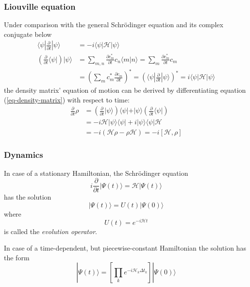 \documentclass[11.5pt,a4paper]{article}
\begin{document}
\subsubsection{Liouville equation}
Under comparison with the general Schr\"odinger equation and its complex conjugate below
\begin{align}
 \langle \psi | \frac{\partial}{\partial t} |\psi\rangle  & = -i \langle \psi | \mathcal{H} |\psi\rangle \\
  \left( \frac{\partial}{\partial t} \langle \psi | \right)  |\psi\rangle
   & = \sum_{m,n} \frac{\partial c_m^*}{\partial t} c_n \langle m | n \rangle 
   =  \sum_{m} \frac{\partial c_m^*}{\partial t} c_m \\
   & = \left( \sum_{m} c_m^* \frac{\partial c_m}{\partial t}\right)^*
   = \left( \langle \psi | \frac{\partial}{\partial t} |\psi\rangle \right)^* = i \langle \psi |\mathcal{H} |\psi\rangle
\end{align}
the density matrix' equation of motion can be derived by differentiating equation (\ref{eq-density-matrix}) with respect to time:
\begin{align}
 \frac{\partial}{\partial t} \rho & = \left( \frac{\partial}{\partial t} | \psi \rangle \right) \langle \psi | + | \psi \rangle \left( \frac{\partial}{\partial t} \langle \psi | \right)  \\
  & = - i \mathcal{H} |\psi\rangle\langle\psi| + i |\psi\rangle\langle\psi| \mathcal{H}  \\
  & = -i ( \mathcal{H} \rho - \rho \mathcal{H} ) = -i [ \mathcal{H}, \rho ] 
  \label{eq-liouville}
\end{align}


\subsubsection{Dynamics}
In case of a stationary Hamiltonian, the Schr\"odinger equation 
\begin{equation}
  i \frac{\partial}{\partial t} | \Psi(t) \rangle = \mathcal{H} |\Psi(t) \rangle
\end{equation}
has the solution
\begin{equation}
  |\Psi(t)\rangle = U(t) | \Psi(0) \rangle
\end{equation}
where 
\begin{equation}
 U(t) = e^{-i \mathcal{H} t}
  \label{eq-evolution}
\end{equation}
is called the \emph{evolution operator}.

In case of a time-dependent, but piecewise-constant Hamiltonian the solution has the form
\begin{equation}
 |\Psi(t)\rangle = \left[ \prod_k e^{-i\mathcal{H}_k \Delta t_k} \right] |\Psi(0)\rangle
\end{equation}
\end{document}
